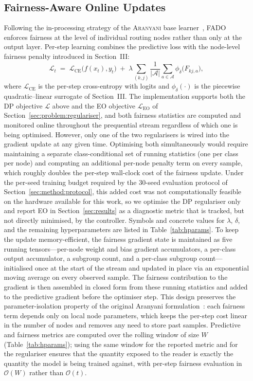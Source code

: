 \documentclass[sigconf,anonymous,review]{acmart}
\begin{document}
\subsection{Fairness-Aware Online Updates}
\label{sec:method:updates}
Following the in-processing strategy of the \textsc{Aranyani} base learner~\cite{chowdhury2024enhancing}, \textsc{FADO} enforces fairness at the level of individual routing
nodes rather than only at the output layer. Per-step learning combines the predictive loss with the node-level fairness penalty introduced in Section~III:
\[
\mathcal{L}_t \;=\; \mathcal{L}_{\mathrm{CE}}\bigl(f(x_t), y_t\bigr) \;+\; \lambda \sum_{(k,j)} \frac{1}{|\mathcal{A}|}\sum_{a \in \mathcal{A}} \phi_\delta\!\bigl(F_{kj,a}\bigr),
\]
where $\mathcal{L}_{\mathrm{CE}}$ is the per-step cross-entropy with logits and $\phi_\delta(\cdot)$ is the piecewise quadratic--linear surrogate of Section~III. The
implementation supports both the DP objective $\mathcal{L}$ above and the EO objective $\mathcal{L}_{\mathrm{EO}}$ of Section~\ref{sec:problem:regulariser}, and
both fairness statistics are computed and monitored online throughout the prequential stream regardless of which one is being optimised. However, only one
of the two regularisers is wired into the gradient update at any given time. Optimising both simultaneously would require maintaining a separate class-conditional set of
running statistics (one per class per node) and computing an additional per-node penalty term on every sample, which roughly doubles the per-step wall-clock cost of the
fairness update. Under the per-seed training budget required by the $30$-seed evaluation protocol of Section~\ref{sec:method:protocol}, this added cost was not
computationally feasible on the hardware available for this work, so we optimise the DP regulariser only and report EO in Section~\ref{sec:results} as a diagnostic
metric that is tracked, but not directly minimised, by the controller. Symbols and concrete values for $\lambda$, $\delta$, and the remaining hyperparameters are listed in Table~\ref{tab:hparams}.
To keep the update memory-efficient, the fairness gradient state is maintained as five running tensors—per-node weight and bias gradient accumulators, a per-class
output accumulator, a subgroup count, and a per-class subgroup count—initialised once at the start of the stream and updated in place via an exponential moving average
on every observed sample. The fairness contribution to the gradient is then assembled in closed form from these running statistics and added to the predictive gradient
before the optimiser step. This design preserves the parameter-isolation property of the original Aranyani formulation~\cite{chowdhury2024enhancing}: each fairness term
depends only on local node parameters, which keeps the per-step cost linear in the number of nodes and removes any need to store past samples.
Predictive and fairness metrics are computed over the rolling window of size $W$ (Table~\ref{tab:hparams}); using the same window for the reported metric and for the
regulariser ensures that the quantity exposed to the reader is exactly the quantity the model is being trained against, with per-step fairness evaluation in $\mathcal{O}(W)$
rather than $\mathcal{O}(t)$.
\end{document}
